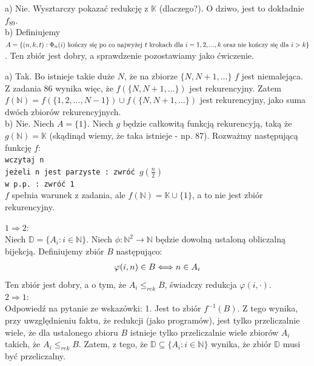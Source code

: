 \documentclass[a4paper,11pt]{article}
\newenvironment{zadanie}[1]
  {\renewcommand\theinnercustomthm{#1}\innercustomthm}
  {\endinnercustomthm}
\begin{document}
\begin{zadanie}{102}
\end{zadanie}
a) Nie. Wysztarczy pokazać redukcję z $\mathbb{K}$ (dlaczego?). O dziwo, jest to dokładnie $f_{89}$. \\

b) Definiujemy $A = \{ (n,k,t) : \Phi_n(i) \text{ kończy się po co najwyżej $t$ krokach dla } \\ 
i=1,2,...,k \text{ oraz nie kończy się dla $i > k$} \}$. Ten zbiór jest dobry, a sprawdzenie pozostawiamy jako ćwiczenie.


\begin{zadanie}{103}
\end{zadanie}
a) Tak. Bo istnieje takie duże $N$, że na zbiorze $\{ N, N+1, ... \}$ $f$ jest niemalejąca. Z zadania $86$ wynika więc, 
że $f(\{ N, N+1, ... \})$ jest rekurencyjny. Zatem $f(\mathbb{N}) = f(\{ 1,2, ... ,N-1 \}) \cup f(\{ N, N+1, ... \})$ jest
rekurencyjny, jako suma dwóch zbiorów rekurencyjnych. \\

b) Nie. Niech $A = \{1\}$. Niech $g$ będzie całkowitą funkcją rekurencyją, taką że $g(\mathbb{N}) = \mathbb{K}$ 
(skądinąd wiemy, że taka istnieje - np. $87$). Rozważmy następującą funkcję $f$: \\
\texttt{wczytaj n \\ jeżeli n jest parzyste : zwróć $g(\frac{n}{2})$ \\ w p.p. : zwróć 1 \\}
$f$ spełnia warunek z zadania, ale $f(\mathbb{N}) = \mathbb{K} \cup \{ 1 \}$, a to nie jest zbiór rekurencyjny.

\begin{zadanie}{104}
\end{zadanie}
$1 \Rightarrow 2$: \\
Niech $\mathbb{D} = \{ A_i : i \in \mathbb{N} \}$. Niech $\phi: \mathbb{N}^2 \longrightarrow \mathbb{N}$ będzie dowolną ustaloną
obliczalną bijekcją. Definiujemy zbiór $B$ następująco: \\
\begin{align}
 \varphi(i,n) \in B \Longleftrightarrow n \in A_i \notag
\end{align}
Ten zbiór jest dobry, a o tym, że $A_i \leqslant_{rek} B$, świadczy redukcja $\varphi(i,\cdot)$. \\
$2 \Rightarrow 1$: \\
Odpowiedź na pytanie ze wskazówki: 1. Jest to zbiór $f^{-1}(B)$. Z tego wynika, przy uwzględnieniu faktu, że redukcji 
(jako programów), jest tylko przeliczalnie wiele, że dla ustalonego zbioru $B$ istnieje tylko przeliczalnie wiele zbiorów
$A_i$ takich, że $A_i \leqslant_{rek} B$. Zatem, z tego, że $\mathbb{D} \subseteq \{ A_i : i \in \mathbb{N} \}$ wynika, że
zbiór $\mathbb{D}$ musi być przeliczalny.
\end{document}
